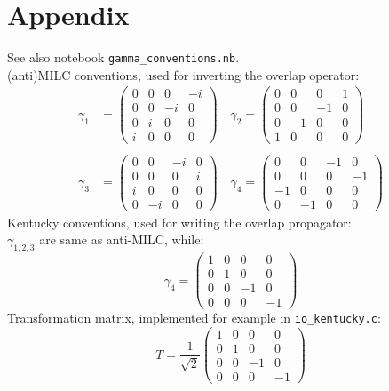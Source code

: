 \documentclass[11pt,a4paper]{article}
\newcommand{\ROOT}[0]{/Users/atlytle/Dropbox/Tex_docs}
\begin{document}
\section{Appendix} 
See also notebook {\tt gamma\_conventions.nb}.\\
(anti)MILC conventions, used for inverting the overlap operator:
\begin{equation}
\begin{split}
\gamma_1 &= 
\begin{pmatrix}
 0 & 0 & 0 & -i \\
 0 & 0 & -i & 0 \\
 0 & i & 0 & 0 \\
 i & 0 & 0 & 0
\end{pmatrix}
\quad
\gamma_2 =
\begin{pmatrix}
 0 & 0 & 0 & 1 \\
 0 & 0 & -1 & 0 \\
 0 & -1 & 0 & 0 \\
 1 & 0 & 0 & 0
\end{pmatrix}
\\ \\
\gamma_3 &=
\begin{pmatrix}
 0 & 0 & -i & 0 \\
 0 & 0 & 0 & i \\
 i & 0 & 0 & 0 \\
 0 & -i & 0 & 0
\end{pmatrix}
\quad
\gamma_4 =
\begin{pmatrix}
 0 & 0 & -1 & 0 \\
 0 & 0 & 0 & -1 \\
 -1 & 0 & 0 & 0 \\
 0 & -1 & 0 & 0
\end{pmatrix}
\end{split}
\end{equation}
Kentucky conventions, used for writing the overlap propagator:\\
$\gamma_{1,2,3}$ are same as anti-MILC, while:
\begin{equation}
\gamma_4 =
\begin{pmatrix}
 1 & 0 & 0 & 0 \\
 0 & 1 & 0 & 0 \\
 0 & 0 & -1 & 0 \\
 0 & 0 & 0 & -1
\end{pmatrix}
\end{equation}
Transformation matrix, implemented for example in {\tt io\_kentucky.c}:
\begin{equation}
T = \frac{1}{\sqrt{2}}
\begin{pmatrix}
 1 & 0 & 0 & 0 \\
 0 & 1 & 0 & 0 \\
 0 & 0 & -1 & 0 \\
 0 & 0 & 0 & -1
\end{pmatrix}
\end{equation}
 




\end{document}
